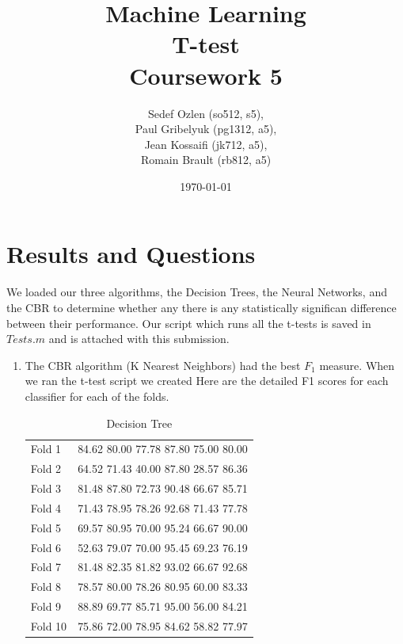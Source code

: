 \documentclass[a4paper,12pt,oneside,final]{report}
\author{
    Sedef Ozlen (so512, s5), \\ 
    Paul Gribelyuk (pg1312, a5), \\
    Jean Kossaifi (jk712, a5), \\ 
    Romain Brault (rb812, a5)
}
\title{\Huge Machine Learning \\ T-test \\ Coursework 5}
\date{\today}
\begin{document}
\maketitle


\chapter{Results and Questions}
We loaded our three algorithms, the Decision Trees, the Neural Networks, and the CBR to determine whether any there is any statistically significan difference between their performance.  Our script which runs all the t-tests is saved in $Tests.m$ and is attached with this submission.
\begin{enumerate}
\item The CBR algorithm (K Nearest Neighbors) had the best $F_1$ measure.  When we ran the t-test script we created
Here are the detailed F1 scores for each classifier for each of the folds.


\begin{table} [H]
\begin{tabular}{ll}
Fold 1 &  84.62  80.00  77.78  87.80  75.00  80.00    \\ 
Fold 2 &  64.52  71.43  40.00  87.80  28.57  86.36    \\ 
Fold 3 &  81.48  87.80  72.73  90.48  66.67  85.71   \\ 
Fold 4 &  71.43  78.95  78.26  92.68  71.43  77.78   \\ 
Fold 5 &  69.57  80.95  70.00  95.24  66.67  90.00   \\ 
Fold 6 &  52.63  79.07  70.00  95.45  69.23  76.19   \\ 
Fold 7 &  81.48  82.35  81.82  93.02  66.67  92.68   \\ 
Fold 8 &  78.57  80.00  78.26  80.95  60.00  83.33  \\ 
Fold 9 &  88.89  69.77  85.71  95.00  56.00  84.21   \\ 
Fold 10 &  75.86  72.00  78.95  84.62  58.82  77.97   \\ 
\end{tabular}
\caption{ Decision Tree  }
\end{table}



\end{enumerate}
\end{document}
